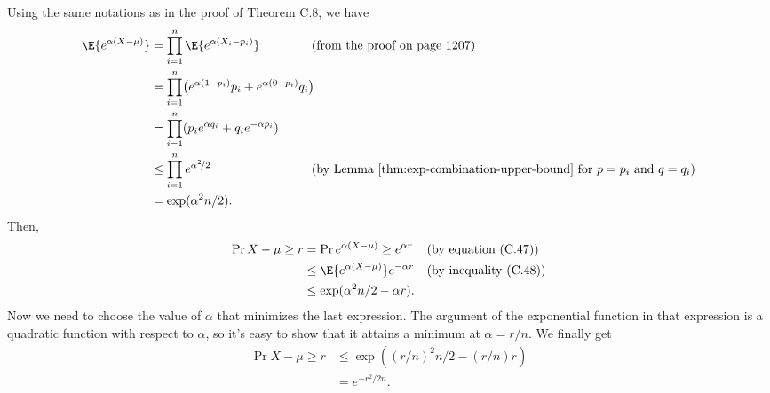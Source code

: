Using the same notations as in the proof of Theorem C.8, we have
\begin{align*}
    \E{e^{\alpha(X-\mu)}} &= \prod_{i=1}^n\E{e^{\alpha(X_i-p_i)}} && \hspace{-12pt}\text{(from the proof on page 1207)} \\
    &= \prod_{i=1}^n\bigl(e^{\alpha(1-p_i)}p_i+e^{\alpha(0-p_i)}q_i\bigr) \\
    &= \prod_{i=1}^n(p_ie^{\alpha q_i}+q_ie^{-\alpha p_i}) \\
    &\le \prod_{i=1}^ne^{\alpha^2\!/2} && \hspace{-12pt}\text{(by Lemma \ref{thm:exp-combination-upper-bound} for $p=p_i$ and $q=q_i$)} \\
    &= \exp(\alpha^2n/2).
\end{align*}
Then,
\begin{align*}
    \Pr{X-\mu\ge r} &= \Pr{e^{\alpha(X-\mu)}\ge e^{\alpha r}} && \text{(by equation (C.47))} \\
    &\le \E{e^{\alpha(X-\mu)}}e^{-\alpha r} && \text{(by inequality (C.48))} \\
    &\le \exp(\alpha^2n/2-\alpha r).
\end{align*}
Now we need to choose the value of $\alpha$ that minimizes the last expression.
The argument of the exponential function in that expression is a quadratic function with respect to $\alpha$, so it's easy to show that it attains a minimum at $\alpha=r/n$.
We finally get
\begin{align*}
    \Pr{X-\mu\ge r} &\le \exp\left((r/n)^2n/2-(r/n)r\right) \\
    &= e^{-r^2\!/{2n}}.
\end{align*}
